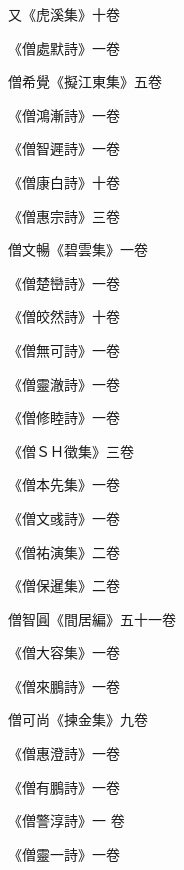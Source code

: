 \begin{pinyinscope}
 又《虎溪集》十卷



 《僧處默詩》一卷



 僧希覺《擬江東集》五卷



 《僧鴻漸詩》一卷



 《僧智遲詩》一卷



 《僧康白詩》十卷



 《僧惠宗詩》三卷



 僧文暢《碧雲集》一卷



 《僧楚巒詩》一卷



 《僧皎然詩》十卷



 《僧無可詩》一卷



 《僧靈澈詩》一卷



 《僧修睦詩》一卷



 《僧ＳＨ徵集》三卷



 《僧本先集》一卷



 《僧文彧詩》一卷



 《僧祐演集》二卷



 《僧保暹集》二卷



 僧智圓《間居編》五十一卷



 《僧大容集》一卷



 《僧來鵬詩》一卷



 僧可尚《揀金集》九卷



 《僧惠澄詩》一卷



 《僧有鵬詩》一卷



 《僧警淳詩》一
 卷



 《僧靈一詩》一卷




\end{pinyinscope}
